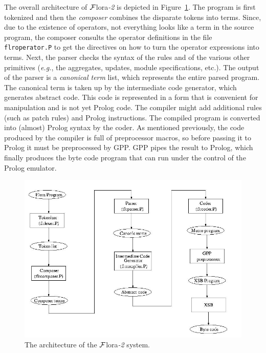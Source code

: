 \documentclass[11pt]{article}
\newcommand{\FLSYSTEM}{{\mbox{\sc ${\cal F}${lora}\rm\emph{-2}}}\xspace}
\begin{document}
The overall architecture of \FLSYSTEM is depicted in Figure~\ref{fig-arch}.
The program is first tokenized and then the \emph{composer} combines the
disparate tokens into terms. Since, due to the existence of operators, not
everything looks like a term in the source program, the composer consults
the operator definitions in the file {\tt flroperator.P} to get the
directives on how to turn the operator expressions into terms. Next, the
parser checks the syntax of the rules and of the various other primitives
({\it e.g.}, the aggregates, updates, module specifications, etc.). The
output of the parser is a \emph{canonical term} list, which represents the
entire parsed program. The canonical term is taken up by the intermediate
code generator, which generates abstract code. This code is represented in
a form that is convenient for manipulation and is not yet Prolog code.  The
compiler might add additional rules (such as patch rules) and Prolog
instructions. The compiled program is converted into (almost) Prolog syntax
by the coder. As mentioned previously, the code produced by the compiler is
full of preprocessor macros, so before passing it to Prolog it must be
preprocessed by GPP. GPP pipes the result to Prolog, which finally produces
the byte code program that can run under the control of the Prolog
emulator.

\begin{figure}[bt]
  \begin{center}
    \includegraphics[width=5.5in]{architecture}
  \end{center}
  \caption{The architecture of the \FLSYSTEM system.}
  \label{fig-arch}
\end{figure}
\end{document}
